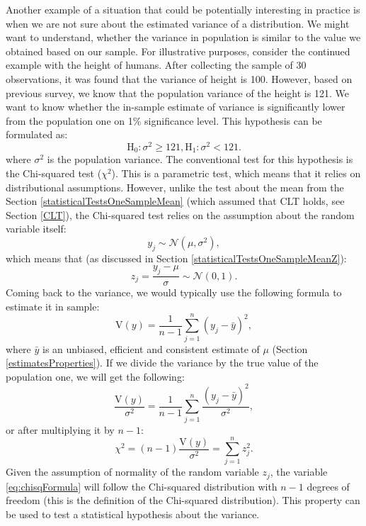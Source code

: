 \documentclass[
]{book}
\theoremstyle{definition}
\theoremstyle{definition}
\theoremstyle{definition}
\theoremstyle{definition}
\theoremstyle{remark}
\begin{document}
Another example of a situation that could be potentially interesting in practice is when we are not sure about the estimated variance of a distribution. We might want to understand, whether the variance in population is similar to the value we obtained based on our sample. For illustrative purposes, consider the continued example with the height of humans. After collecting the sample of 30 observations, it was found that the variance of height is 100. However, based on previous survey, we know that the population variance of the height is 121. We want to know whether the in-sample estimate of variance is significantly lower from the population one on 1\% significance level. This hypothesis can be formulated as:
\begin{equation*}
    \mathrm{H}_0: \sigma^2 \geq 121, \mathrm{H}_1: \sigma^2 < 121 .
\end{equation*}
where \(\sigma^2\) is the population variance. The conventional test for this hypothesis is the Chi-squared test (\(\chi^2\)). This is a parametric test, which means that it relies on distributional assumptions. However, unlike the test about the mean from the Section \ref{statisticalTestsOneSampleMean} (which assumed that CLT holds, see Section \ref{CLT}), the Chi-squared test relies on the assumption about the random variable itself:
\begin{equation*}
    y_j \sim \mathcal{N}(\mu, \sigma^2) ,
\end{equation*}
which means that (as discussed in Section \ref{statisticalTestsOneSampleMeanZ}):
\begin{equation*}
    z_j = \frac{y_j - \mu}{\sigma} \sim \mathcal{N}(0, 1) .
\end{equation*}
Coming back to the variance, we would typically use the following formula to estimate it in sample:
\begin{equation*}
    \mathrm{V}\left( y \right) = \frac{1}{n-1} \sum_{j=1}^n \left(y_j - \bar{y} \right)^2,
\end{equation*}
where \(\bar{y}\) is an unbiased, efficient and consistent estimate of \(\mu\) (Section \ref{estimatesProperties}). If we divide the variance by the true value of the population one, we will get the following:
\begin{equation*}
    \frac{\mathrm{V}\left( y \right)}{\sigma^2} = \frac{1}{n-1} \sum_{j=1}^n \frac{\left(y_j - \bar{y} \right)^2}{\sigma^2},
\end{equation*}
or after multiplying it by \(n-1\):
\begin{equation}
    \chi^2 = (n-1) \frac{\mathrm{V}\left( y \right)}{\sigma^2} = \sum_{j=1}^n z_j^2 .
    \label{eq:chisqFormula}
\end{equation}
Given the assumption of normality of the random variable \(z_j\), the variable \eqref{eq:chisqFormula} will follow the Chi-squared distribution with \(n-1\) degrees of freedom (this is the definition of the Chi-squared distribution). This property can be used to test a statistical hypothesis about the variance.
\end{document}
